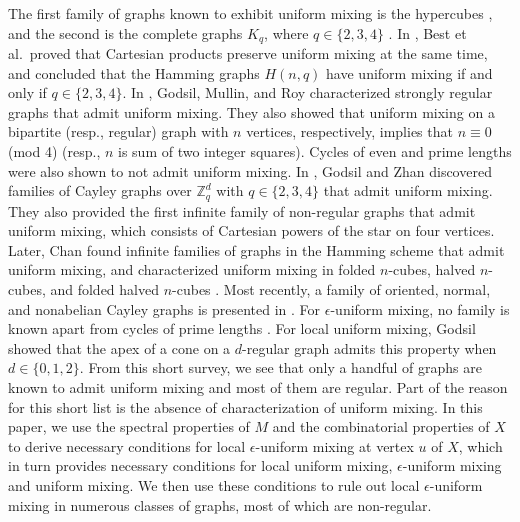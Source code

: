 \documentclass[11pt]{article}
\def\Z{\mathbb{Z}}
\begin{document}
The first family of graphs known to exhibit uniform mixing is the hypercubes \cite{moore2002quantum}, and the second is the complete graphs $K_q$, where $q\in\{2,3,4\}$ \cite{Ahmadi}. In \cite{best2008mixing}, Best et al.\ proved that Cartesian products preserve uniform mixing at the same time, and concluded that the Hamming graphs $H(n,q)$ have uniform mixing if and only if $q\in\{2,3,4\}$. In \cite{Godsil2013}, Godsil, Mullin, and Roy characterized strongly regular graphs that admit uniform mixing. They also showed that uniform mixing on a bipartite (resp., regular) graph with $n$ vertices, respectively, implies that $n\equiv 0$ (mod 4) (resp., $n$ is sum of two integer squares). Cycles of even and prime lengths were also shown to not admit uniform mixing. In \cite{Godsil2015UniformMO}, Godsil and Zhan discovered families of Cayley graphs over $\Z_q^d$ with $q\in\{2,3,4\}$ that admit uniform mixing. They also provided the first infinite family of non-regular graphs that admit uniform mixing, which consists of Cartesian powers of the star on four vertices. Later, Chan found infinite families of graphs in the Hamming scheme that admit uniform mixing, and characterized uniform mixing in folded $n$-cubes, halved $n$-cubes, and folded halved $n$-cubes \cite{Chan2013}. Most recently, a family of oriented, normal, and nonabelian Cayley graphs is presented in \cite{sin2025uniform}. For $\epsilon$-uniform mixing, no family is known apart from cycles of prime lengths \cite{Godsil2013}. For local uniform mixing, Godsil showed that the apex of a cone on a $d$-regular graph admits this property \cite{SedQW} when $d\in\{0,1,2\}$. From this short survey, we see that only a handful of graphs are known to admit uniform mixing and most of them are regular. Part of the reason for this short list is the absence of characterization of uniform mixing. In this paper, we use the spectral properties of $M$ and the combinatorial properties of $X$ to derive necessary conditions for local $\epsilon$-uniform mixing at vertex $u$ of $X$, which in turn provides necessary conditions for local uniform mixing, $\epsilon$-uniform mixing and uniform mixing. We then use these conditions to rule out local $\epsilon$-uniform mixing in numerous classes of graphs, most of which are non-regular. 
\end{document}
